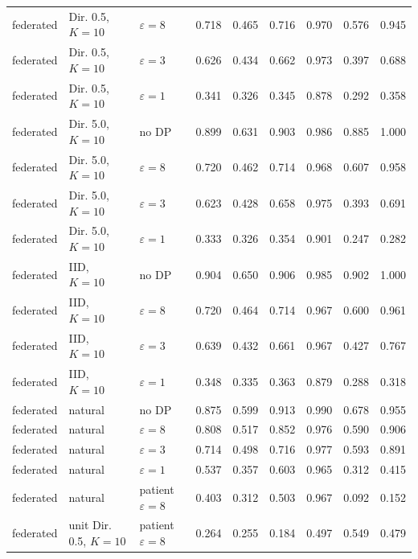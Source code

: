 {\begin{longtable}{lllrrrrrr}
federated & Dir. 0.5, $K{=}10$ & $\varepsilon=8$ & 0.718 & 0.465 & 0.716 & 0.970 & 0.576 & 0.945 \\
federated & Dir. 0.5, $K{=}10$ & $\varepsilon=3$ & 0.626 & 0.434 & 0.662 & 0.973 & 0.397 & 0.688 \\
federated & Dir. 0.5, $K{=}10$ & $\varepsilon=1$ & 0.341 & 0.326 & 0.345 & 0.878 & 0.292 & 0.358 \\
federated & Dir. 5.0, $K{=}10$ & no DP & 0.899 & 0.631 & 0.903 & 0.986 & 0.885 & 1.000 \\
federated & Dir. 5.0, $K{=}10$ & $\varepsilon=8$ & 0.720 & 0.462 & 0.714 & 0.968 & 0.607 & 0.958 \\
federated & Dir. 5.0, $K{=}10$ & $\varepsilon=3$ & 0.623 & 0.428 & 0.658 & 0.975 & 0.393 & 0.691 \\
federated & Dir. 5.0, $K{=}10$ & $\varepsilon=1$ & 0.333 & 0.326 & 0.354 & 0.901 & 0.247 & 0.282 \\
federated & IID, $K{=}10$ & no DP & 0.904 & 0.650 & 0.906 & 0.985 & 0.902 & 1.000 \\
federated & IID, $K{=}10$ & $\varepsilon=8$ & 0.720 & 0.464 & 0.714 & 0.967 & 0.600 & 0.961 \\
federated & IID, $K{=}10$ & $\varepsilon=3$ & 0.639 & 0.432 & 0.661 & 0.967 & 0.427 & 0.767 \\
federated & IID, $K{=}10$ & $\varepsilon=1$ & 0.348 & 0.335 & 0.363 & 0.879 & 0.288 & 0.318 \\
federated & natural & no DP & 0.875 & 0.599 & 0.913 & 0.990 & 0.678 & 0.955 \\
federated & natural & $\varepsilon=8$ & 0.808 & 0.517 & 0.852 & 0.976 & 0.590 & 0.906 \\
federated & natural & $\varepsilon=3$ & 0.714 & 0.498 & 0.716 & 0.977 & 0.593 & 0.891 \\
federated & natural & $\varepsilon=1$ & 0.537 & 0.357 & 0.603 & 0.965 & 0.312 & 0.415 \\
federated & natural & patient $\varepsilon=8$ & 0.403 & 0.312 & 0.503 & 0.967 & 0.092 & 0.152 \\
federated & unit Dir. 0.5, $K{=}10$ & patient $\varepsilon=8$ & 0.264 & 0.255 & 0.184 & 0.497 & 0.549 & 0.479 \\
\end{longtable}}


